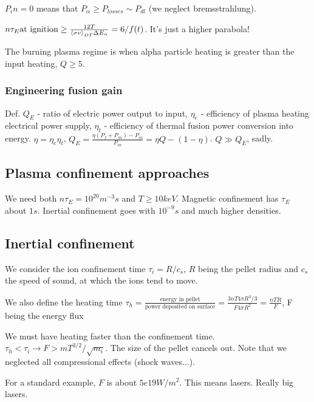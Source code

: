 \documentclass[PlasmaNotes.tex]{subfiles}
\begin{document}
$P_in = 0$ means that $P_\alpha \geq P_{losses} \sim P_{dl}$ (we neglect bremsstrahlung).

$n \tau_E \text{at ignition} \geq \frac{12 T}{\left< \sigma v \right>_{DT} \Delta E_\alpha} = 6/f(t)$. It's just a higher parabola!


The burning plasma regime is when alpha particle heating is greater than the input heating, $Q \geq 5$.

\subsubsection{Engineering fusion gain}

Def. $Q_E$ - ratio of electric power output to input, $\eta_e$ - efficiency of plasma heating electrical power supply, $\eta_t$ - efficiency of thermal fusion power conversion into energy. $\eta = \eta_e \eta_t$, $Q_E=\frac{\eta(P_f + P_{in}) - P_{in}}{P_{in}} = \eta Q - (1-\eta)$. $Q \gg Q_E$, sadly.

\subsection{Plasma confinement approaches}

We need both $n \tau_E = 10^{20} m^{-3} s$ and $T\geq 10 keV$. Magnetic confinement has $\tau_E$ about $1s$. Inertial confinement goes with $10^{-9}s$ and much higher densities.



\subsection{Inertial confinement}

We consider the ion confinement time $\tau_i = R/c_s$, $R$ being the pellet radius and $c_s$ the speed of sound, at which the ions tend to move.

We also define the heating time $\tau_h=\frac{\text{energy in pellet}}{\text{power deposited on surface}}=\frac{3nT 4\pi R^3/3}{F 4 \pi R^2} = \frac{n T R}{F}$, F being the energy flux

We must have heating faster than the confinement time. $\tau_h < \tau_i \rightarrow F >  m T^{3/2} / \sqrt{m_i}$. The size of the pellet cancels out. Note that we neglected all compressional effects (shock waves...).

For a standard example, $F$ is about $5e19 W/m^2$. This means lasers. Really big lasers.
\end{document}
